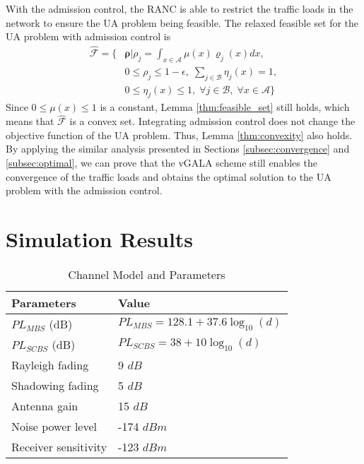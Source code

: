 \documentclass[journal]{IEEEtran}
\theoremstyle{definition}
\begin{document}
With the admission control, the RANC is able to restrict the traffic loads in the network to ensure the UA problem being feasible. The relaxed feasible set for the UA problem with admission control is
\begin{align}
\label{eq:relax_feasible_uac}
\mathcal{\hat{F}}=\lbrace &\boldsymbol{\rho}|\rho_{j}=\int_{x \in \mathcal{A}}\mu(x)\varrho_{j}(x)dx,\nonumber\\
&0\leq\rho_{j}\leq 1-\epsilon,\; \sum_{j\in\mathcal{B}}\eta_{j}(x)=1,\nonumber\\
& 0\leq \eta_{j}(x)\leq 1,\;\forall j\in\mathcal{B},\;\forall x \in\mathcal{A}\rbrace
\end{align}
Since $0\leq\mu(x)\leq 1$ is a constant, Lemma \ref{thm:feasible_set} still holds, which means that $\mathcal{\hat{F}}$ is a convex set. Integrating admission control does not change the objective function of the UA problem. Thus, Lemma \ref{thm:convexity} also holds. By applying the similar analysis presented in Sections \ref{subsec:convergence} and \ref{subsec:optimal}, we can prove that the vGALA scheme still enables the convergence of the traffic loads and obtains the optimal solution to the UA problem with the admission control.




\section{Simulation Results}
\label{sec:simulation}

\begin{table}[ht]
\caption{Channel Model and Parameters}
\centering
\begin{tabular}{l||l}
\hline
Parameters & Value\\
\hline
$PL_{MBS}$ (dB) & $PL_{MBS}=128.1+37.6\log_{10}(d)$\\
$PL_{SCBS}$ (dB) & $PL_{SCBS}=38+10\log_{10}(d)$ \\
Rayleigh fading & 9 $dB$\\
Shadowing fading & 5 $dB$ \\
Antenna gain & 15 $dB$\\
Noise power level & -174 $dBm$ \\
Receiver sensitivity & -123 $dBm$ \\
\hline
\end{tabular}
\label{table:sim_parameters}
\end{table}
\end{document}
